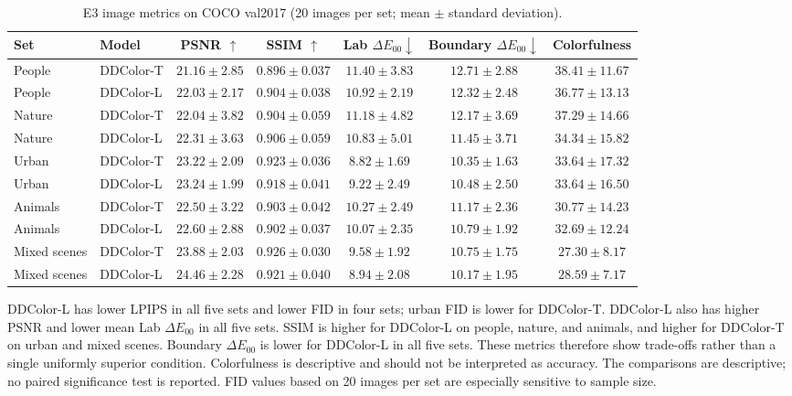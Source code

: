 \documentclass{FastFyp}
\begin{document}
\begin{table}[htbp]
\centering
\caption{E3 image metrics on COCO val2017 (20 images per set; mean $\pm$ standard deviation).}
\label{tab:e3-image-metrics}
\small
\begin{tabular}{llccccc}
\hline
Set & Model & PSNR $\uparrow$ & SSIM $\uparrow$ & Lab $\Delta E_{00}\downarrow$ & Boundary $\Delta E_{00}\downarrow$ & Colorfulness\\
\hline
People & DDColor-T & $21.16\pm2.85$ & $0.896\pm0.037$ & $11.40\pm3.83$ & $12.71\pm2.88$ & $38.41\pm11.67$\\
People & DDColor-L & $22.03\pm2.17$ & $0.904\pm0.038$ & $10.92\pm2.19$ & $12.32\pm2.48$ & $36.77\pm13.13$\\
Nature & DDColor-T & $22.04\pm3.82$ & $0.904\pm0.059$ & $11.18\pm4.82$ & $12.17\pm3.69$ & $37.29\pm14.66$\\
Nature & DDColor-L & $22.31\pm3.63$ & $0.906\pm0.059$ & $10.83\pm5.01$ & $11.45\pm3.71$ & $34.34\pm15.82$\\
Urban & DDColor-T & $23.22\pm2.09$ & $0.923\pm0.036$ & $8.82\pm1.69$ & $10.35\pm1.63$ & $33.64\pm17.32$\\
Urban & DDColor-L & $23.24\pm1.99$ & $0.918\pm0.041$ & $9.22\pm2.49$ & $10.48\pm2.50$ & $33.64\pm16.50$\\
Animals & DDColor-T & $22.50\pm3.22$ & $0.903\pm0.042$ & $10.27\pm2.49$ & $11.17\pm2.36$ & $30.77\pm14.23$\\
Animals & DDColor-L & $22.60\pm2.88$ & $0.902\pm0.037$ & $10.07\pm2.35$ & $10.79\pm1.92$ & $32.69\pm12.24$\\
Mixed scenes & DDColor-T & $23.88\pm2.03$ & $0.926\pm0.030$ & $9.58\pm1.92$ & $10.75\pm1.75$ & $27.30\pm8.17$\\
Mixed scenes & DDColor-L & $24.46\pm2.28$ & $0.921\pm0.040$ & $8.94\pm2.08$ & $10.17\pm1.95$ & $28.59\pm7.17$\\
\hline
\end{tabular}
\end{table}

DDColor-L has lower LPIPS in all five sets and lower FID in four sets; urban
FID is lower for DDColor-T. DDColor-L also has higher PSNR and lower mean Lab
$\Delta E_{00}$ in all five sets. SSIM is higher for DDColor-L on people,
nature, and animals, and higher for DDColor-T on urban and mixed scenes.
Boundary $\Delta E_{00}$ is lower for DDColor-L in all five sets. These
metrics therefore show trade-offs rather than a single uniformly superior
condition. Colorfulness is descriptive and should not be interpreted as
accuracy. The comparisons are descriptive; no paired significance test is
reported. FID values based on 20 images per set are especially sensitive to
sample size.
\end{document}
